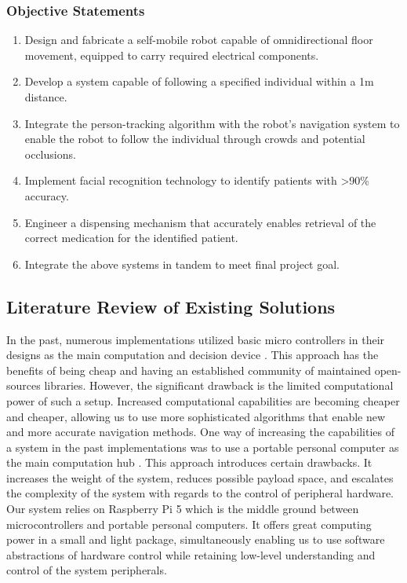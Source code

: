 \documentclass{article}
\begin{document}
\subsubsection{Objective Statements}
\begin{enumerate}
    \item Design and fabricate a self-mobile robot capable of omnidirectional floor movement, equipped to carry required electrical components.
    \item Develop a system capable of following a specified individual within a 1m distance.
    \item Integrate the person-tracking algorithm with the robot’s navigation system to enable the robot to follow the individual through crowds and potential occlusions.
    \item Implement facial recognition technology to identify patients with >90\% accuracy.
    \item Engineer a dispensing mechanism that accurately enables retrieval of the correct medication for the identified patient.
    \item Integrate the above systems in tandem to meet final project goal.
\end{enumerate}

\subsection{Literature Review of Existing Solutions}
In the past, numerous implementations utilized basic micro controllers in their designs as the main computation and decision device \cite{ilias2014hospital}. This approach has the benefits of being cheap and having an established community of maintained open-sources libraries. However, the significant drawback is the limited computational power of such a setup. Increased computational capabilities are becoming cheaper and cheaper, allowing us to use more sophisticated algorithms that enable new and more accurate navigation methods. One way of increasing the capabilities of a system in the past implementations was to use a portable personal computer as the main computation hub \cite{ilias2014nurse}\cite{kautsar2019simple}. This approach introduces certain drawbacks. It increases the weight of the system, reduces possible payload space, and escalates the complexity of the system with regards to the control of peripheral hardware. Our system relies on Raspberry Pi 5 which is the middle ground between microcontrollers and portable personal computers. It offers great computing power in a small and light package, simultaneously enabling us to use software abstractions of hardware control while retaining low-level understanding and control of the system peripherals.
\end{document}
